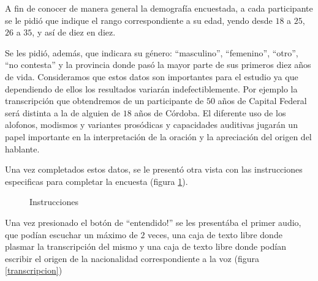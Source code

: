 A fin de conocer de manera general la demografía encuestada, a cada participante se le pidió que indique el rango correspondiente a su edad, yendo desde $18$ a $25$, $26$ a $35$, y así de diez en diez.

Se les pidió, además, que indicara su género: ``masculino'', ``femenino'', ``otro'', ``no contesta'' y la provincia donde pasó la mayor parte de sus primeros diez años de vida. Consideramos que estos datos son importantes para el estudio ya que dependiendo de ellos los resultados variarán indefectiblemente. Por ejemplo la transcripción que obtendremos de un participante de $50$ años de Capital Federal será distinta a la de alguien de $18$ años de Córdoba. El diferente uso de los alofonos, modismos y variantes prosódicas y capacidades auditivas jugarán un papel importante en la interpretación de la oración y la apreciación del origen del hablante.

Una vez completados estos datos, se le presentó otra vista con las instrucciones especificas para completar la encuesta (figura \ref{instrucciones}).

\begin{figure}
\begin{center}
\end{center}
\caption{Instrucciones}
\label{instrucciones}
\end{figure}

Una vez presionado el botón de ``entendido!'' se les presentába el primer audio, que podían escuchar un máximo de $2$ veces, una caja de texto libre donde plasmar la transcripción del mismo y una caja de texto libre donde podían escribir el origen de la nacionalidad correspondiente a la voz (figura \ref{transcripcion})


